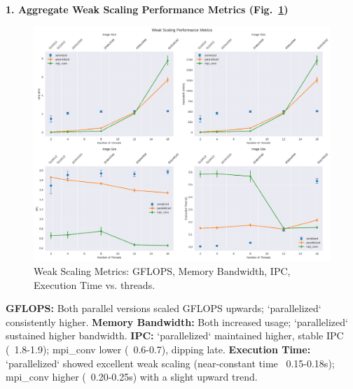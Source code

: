 \documentclass[conference, 10pt]{IEEEtran}
\begin{document}
\textbf{1. Aggregate Weak Scaling Performance Metrics (Fig.~\ref{fig:weak-scaling-metrics})}
\begin{figure}[H]
    \centering
    \includegraphics[width=0.9\linewidth]{figures/weak_scaling_metrics.png}
    \caption{Weak Scaling Metrics: GFLOPS, Memory Bandwidth, IPC, Execution Time vs. threads.}
    \label{fig:weak-scaling-metrics}
\end{figure}
    \textbf{GFLOPS:} Both parallel versions scaled GFLOPS upwards; `parallelized` consistently higher.
    \textbf{Memory Bandwidth:} Both increased usage; `parallelized` sustained higher bandwidth.
    \textbf{IPC:} `parallelized` maintained higher, stable IPC (~1.8-1.9); mpi\_conv lower (~0.6-0.7), dipping late.
    \textbf{Execution Time:} `parallelized` showed excellent weak scaling (near-constant time ~0.15-0.18s); mpi\_conv higher (~0.20-0.25s) with a slight upward trend.
\end{document}
